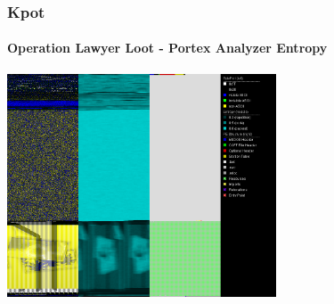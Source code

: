 \documentclass[aspectratio=169]{beamer}
\begin{document}
{
\begin{frame}
  \frametitle{Kpot}
  \framesubtitle{Operation Lawyer Loot - Portex Analyzer Entropy}
  \begin{center}
    \includegraphics[width=8cm]{kpot-portex-analyzer-stage-1}
  \end{center}
\end{frame}
}
\end{document}
